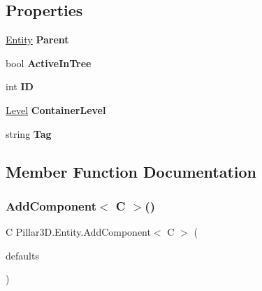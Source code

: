 \subsection*{Properties}
\begin{DoxyCompactItemize}
\item 
\mbox{\label{class_pillar3_d_1_1_entity_adfc52dc8ac331406e8e4b1532ade729e}} 
\hyperlink{class_pillar3_d_1_1_entity}{Entity} {\bfseries Parent}
\item 
\mbox{\label{class_pillar3_d_1_1_entity_a3d99069a63a32e59f7504d646f854c2c}} 
bool {\bfseries Active\+In\+Tree}
\item 
\mbox{\label{class_pillar3_d_1_1_entity_a145351b0612b86a83bc2cf7bb8e5b6fa}} 
int {\bfseries ID}
\item 
\mbox{\label{class_pillar3_d_1_1_entity_adb21c036bafae9305d9d130c12a58ce1}} 
\hyperlink{class_pillar3_d_1_1_level}{Level} {\bfseries Container\+Level}
\item 
\mbox{\label{class_pillar3_d_1_1_entity_aaedc6ef17992adffd4e2f23fc0e8475c}} 
string {\bfseries Tag}
\end{DoxyCompactItemize}


\subsection{Member Function Documentation}
\mbox{\label{class_pillar3_d_1_1_entity_aa074e5244bd8980eebc56863a6d77aaf}} 
\subsubsection{\texorpdfstring{Add\+Component$<$ C $>$()}{AddComponent< C >()}}
{\footnotesize\ttfamily C Pillar3\+D.\+Entity.\+Add\+Component$<$ C $>$ (\begin{DoxyParamCaption}\item[{Xml\+Reader}]{defaults }\end{DoxyParamCaption})}



